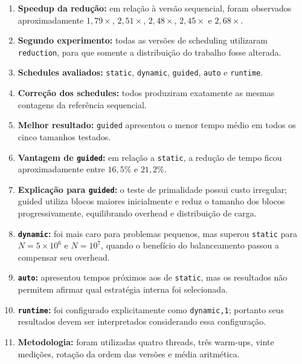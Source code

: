 \begin{enumerate}
    \item \textbf{Speedup da redução:}
    em relação à versão sequencial, foram observados aproximadamente
    \(1,79\times\), \(2,51\times\), \(2,48\times\),
    \(2,45\times\) e \(2,68\times\).

    \item \textbf{Segundo experimento:}
    todas as versões de scheduling utilizaram \texttt{reduction}, para que
    somente a distribuição do trabalho fosse alterada.

    \item \textbf{Schedules avaliados:}
    \texttt{static}, \texttt{dynamic}, \texttt{guided}, \texttt{auto} e
    \texttt{runtime}.

    \item \textbf{Correção dos schedules:}
    todos produziram exatamente as mesmas contagens da referência
    sequencial.

    \item \textbf{Melhor resultado:}
    \texttt{guided} apresentou o menor tempo médio em todos os cinco
    tamanhos testados.

    \item \textbf{Vantagem de \texttt{guided}:}
    em relação a \texttt{static}, a redução de tempo ficou aproximadamente
    entre \(16,5\%\) e \(21,2\%\).

    \item \textbf{Explicação para \texttt{guided}:}
    o teste de primalidade possui custo irregular; guided utiliza blocos
    maiores inicialmente e reduz o tamanho dos blocos progressivamente,
    equilibrando overhead e distribuição de carga.

    \item \textbf{\texttt{dynamic}:}
    foi mais caro para problemas pequenos, mas superou \texttt{static} para
    \(N=5\times10^6\) e \(N=10^7\), quando o benefício do balanceamento
    passou a compensar seu overhead.

    \item \textbf{\texttt{auto}:}
    apresentou tempos próximos aos de \texttt{static}, mas os resultados
    não permitem afirmar qual estratégia interna foi selecionada.

    \item \textbf{\texttt{runtime}:}
    foi configurado explicitamente como \texttt{dynamic,1}; portanto seus
    resultados devem ser interpretados considerando essa configuração.

    \item \textbf{Metodologia:}
    foram utilizadas quatro threads, três warm-ups, vinte medições,
    rotação da ordem das versões e média aritmética.


\end{enumerate}
